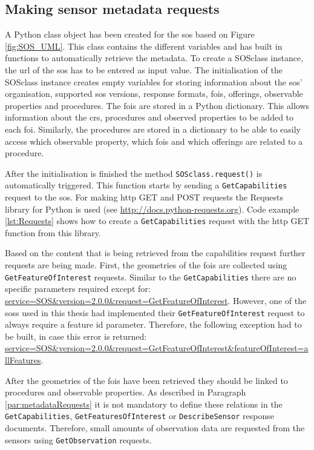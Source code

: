 \subsection{Making sensor metadata requests}
A Python class object has been created for the \ac{sos} based on Figure \ref{fig:SOS_UML}. This class contains the different variables and has built in functions to automatically retrieve the metadata. To create a SOSclass instance, the \ac{url} of the \ac{sos} has to be entered as input value. The initialisation of the SOSclass instance creates empty variables for storing information about the \ac{sos}' organisation, supported \ac{sos} versions, response formats, \acp{foi}, offerings, observable properties and procedures. The \acp{foi} are stored in a Python dictionary. This allows information about the \ac{crs}, procedures and observed properties to be added to each \ac{foi}. Similarly, the procedures are stored in a dictionary to be able to easily access which observable property, which \acp{foi} and which offerings are related to a procedure.

After the initialisation is finished the method \texttt{SOSclass.request()} is automatically triggered. This function starts by sending a \texttt{GetCapabilities} request to the \ac{sos}. For making \ac{http} GET and POST requests the Requests library for Python is used (see \url{http://docs.python-requests.org}). Code example \ref{lst:Requests} shows how to create a \texttt{GetCapabilities} request with the \ac{http} GET function from this library.

\begin{sloppypar}
	Based on the content that is being retrieved from the capabilities request further requests are being made. First, the geometries of the \acp{foi} are collected using \texttt{GetFeatureOfInterest} requests. Similar to the \texttt{GetCapabilities} there are no specific parameters required except for: \url{service=SOS&version=2.0.0&request=GetFeatureOfInterest}. However, one of the \aclp{sos} used in this thesis had implemented their \texttt{GetFeatureOfInterest} request to always require a feature id parameter. Therefore, the following exception had to be built, in case this error is returned: \url{service=SOS&version=2.0.0&request=GetFeatureOfInterest&featureOfInterest=allFeatures}.
\end{sloppypar}

\begin{sloppypar}
After the geometries of the \acp{foi} have been retrieved they should be linked to procedures and observable properties. As described in Paragraph \ref{par:metadataRequests} it is not mandatory to define these relations in the \texttt{GetCapabilities}, \texttt{GetFeaturesOfInterest} or \texttt{DescribeSensor} response documents. Therefore, small amounts of observation data are requested from the sensors using \texttt{GetObservation} requests.  
\end{sloppypar}

